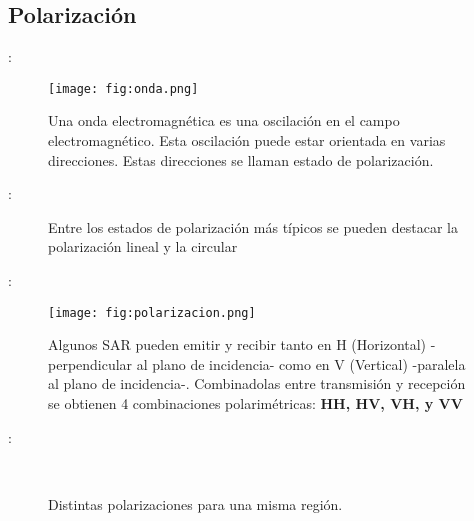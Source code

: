 \subsection{Polarización}

\begin{frame}{\secname : \subsecname}
  \begin{figure}
    \centering
    \texttt{[image: fig:onda.png]}
    \caption{Una onda electromagnética es una oscilación en el campo electromagnético. Esta oscilación puede estar orientada en varias direcciones. Estas direcciones se llaman estado de polarización.}
    \label{}
  \end{figure}
\end{frame}

\begin{frame}{\secname : \subsecname}
  \begin{figure}
    \centering
    \caption{Entre los estados de polarización más típicos se pueden destacar la polarización lineal y la circular}
    \label{}
  \end{figure}
\end{frame}



\begin{frame}{\secname : \subsecname}
  \begin{figure}
    \centering
    \texttt{[image: fig:polarizacion.png]}
    \caption{Algunos SAR pueden emitir y recibir tanto en H (Horizontal) -perpendicular al plano de incidencia- como en V (Vertical) -paralela al plano de incidencia-. Combinadolas entre transmisión y recepción se obtienen 4 combinaciones polarimétricas: {\bf HH, HV, VH, y VV}}
    \label{}
  \end{figure}
\end{frame}

\begin{frame}{\secname : \subsecname}
  \begin{figure}
    \centering
    \hspace{1cm}
    \\
    \hspace{1cm}
    \caption{Distintas polarizaciones para una misma región.}
  \end{figure}
\end{frame}


